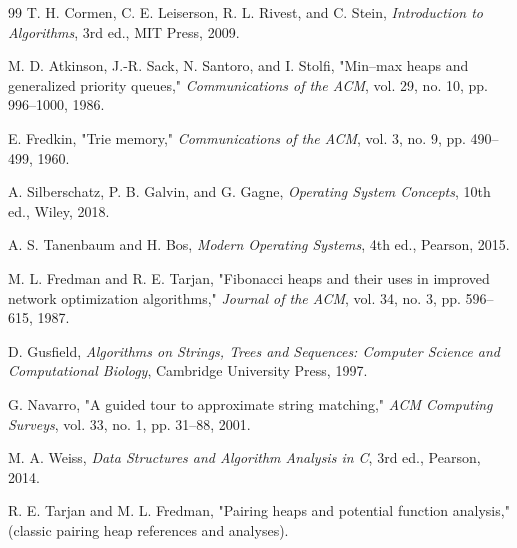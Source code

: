 \documentclass[conference,10pt]{IEEEtran}
\begin{document}

\begin{thebibliography}{99}
T. H. Cormen, C. E. Leiserson, R. L. Rivest, and C. Stein, \textit{Introduction to Algorithms}, 3rd ed., MIT Press, 2009.

M. D. Atkinson, J.-R. Sack, N. Santoro, and I. Stolfi, "Min--max heaps and generalized priority queues," \textit{Communications of the ACM}, vol. 29, no. 10, pp. 996--1000, 1986.

E. Fredkin, "Trie memory," \textit{Communications of the ACM}, vol. 3, no. 9, pp. 490--499, 1960.

A. Silberschatz, P. B. Galvin, and G. Gagne, \textit{Operating System Concepts}, 10th ed., Wiley, 2018.

A. S. Tanenbaum and H. Bos, \textit{Modern Operating Systems}, 4th ed., Pearson, 2015.

M. L. Fredman and R. E. Tarjan, "Fibonacci heaps and their uses in improved network optimization algorithms," \textit{Journal of the ACM}, vol. 34, no. 3, pp. 596--615, 1987.

D. Gusfield, \textit{Algorithms on Strings, Trees and Sequences: Computer Science and Computational Biology}, Cambridge University Press, 1997.

G. Navarro, "A guided tour to approximate string matching," \textit{ACM Computing Surveys}, vol. 33, no. 1, pp. 31--88, 2001.

M. A. Weiss, \textit{Data Structures and Algorithm Analysis in C}, 3rd ed., Pearson, 2014.

R. E. Tarjan and M. L. Fredman, "Pairing heaps and potential function analysis," (classic pairing heap references and analyses). %

\end{thebibliography}

\end{document}

